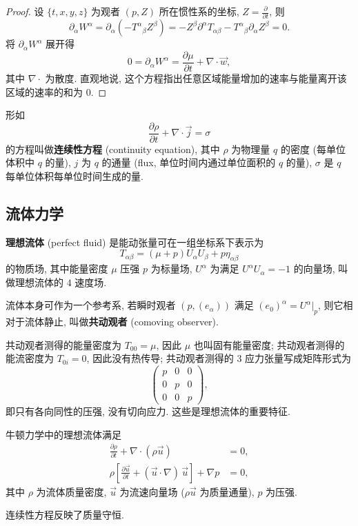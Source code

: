 \begin{proof}
    设 $ \{t,x,y,z\} $ 为观者 $(p,Z)$ 所在惯性系的坐标, $ \displaystyle Z= \frac{\partial}{\partial t}$, 则
    \[ \partial_\alpha W^\alpha = \partial_\alpha(-T^\alpha{}_\beta Z^\beta)=-Z^\beta\partial^\alpha T_{\alpha\beta}-T^\alpha{}_\beta\partial_\alpha Z^\beta=0. \]
    将 $\partial_\alpha W^{\alpha}$ 展开得
    \[ 0=\partial_\alpha W^\alpha=\frac{\partial\mu}{\partial t}+\nabla\cdot \vec{w}, \]
    其中 $ \nabla\cdot $ 为散度. 直观地说, 这个方程指出任意区域能量增加的速率与能量离开该区域的速率的和为 $ 0 $.
\end{proof}
\begin{remark}
    形如
    \[ \frac{\partial\rho}{\partial t}+\nabla\cdot \vec{j}=\sigma \]
    的方程叫做{\bf 连续性方程} (continuity equation), 其中 $ \rho $ 为物理量 $ q $ 的密度 (每单位体积中 $ q $ 的量), $ j $ 为 $ q $ 的通量 (flux, 单位时间内通过单位面积的 $ q $ 的量), $ \sigma $ 是 $ q $ 每单位体积每单位时间生成的量.
\end{remark}

\subsection{流体力学}
\begin{definition}
    {\bf 理想流体} (perfect fluid) 是能动张量可在一组坐标系下表示为
    \[ T_{\alpha\beta}=(\mu+p)U_\alpha U_\beta+p\eta_{\alpha\beta} \]
    的物质场, 其中能量密度 $ \mu $  压强 $ p $ 为标量场, $ U^\alpha $ 为满足 $ U^\alpha U_\alpha=-1 $ 的向量场, 叫做理想流体的 $ 4 $ 速度场.
\end{definition}
流体本身可作为一个参考系, 若瞬时观者 $ (p,(e_\alpha)) $ 满足 $ (e_0)^{\alpha}=U^{\alpha}|_p $, 则它相对于流体静止, 叫做{\bf 共动观者} (comoving observer).

共动观者测得的能量密度为 $ T_{00}=\mu $, 因此 $ \mu $ 也叫固有能量密度; 共动观者测得的能流密度为 $ T_{0i}=0 $, 因此没有热传导; 共动观者测得的 $3$ 应力张量写成矩阵形式为
\[ \left(\begin{matrix}
    p & 0 & 0\\ 
    0 & p & 0\\ 
    0 & 0 & p
\end{matrix}\right), \]
即只有各向同性的压强, 没有切向应力. 这些是理想流体的重要特征.

牛顿力学中的理想流体满足
\begin{align*}
    \frac{\partial\rho}{\partial t}+\nabla\cdot(\rho \vec{u})&=0,\tag{连续性方程}\\
    \rho\left[ \frac{\partial \vec{u}}{\partial t}+(\vec{u}\cdot\nabla)\,\vec{u} \right]+\nabla p&=0,\tag{欧拉方程}
\end{align*}
其中 $ \rho $ 为流体质量密度, $ \vec{u} $ 为流速向量场 ($ \rho \vec{u} $ 为质量通量), $ p $ 为压强. 
\begin{remark}
    连续性方程反映了质量守恒.
\end{remark}

